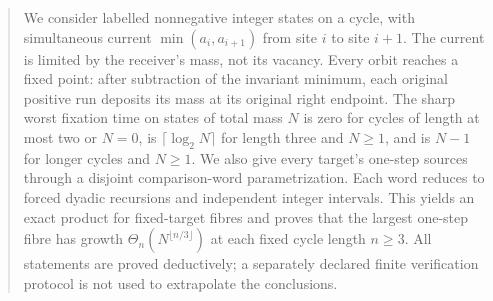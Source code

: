 \begin{abstract}
We consider labelled nonnegative integer states on a cycle, with simultaneous
current $\min(a_i,a_{i+1})$ from site $i$ to site $i+1$. The current is
limited by the receiver's mass, not its vacancy. Every orbit reaches a
fixed point: after subtraction of the invariant minimum, each original
positive run deposits its mass at its original right endpoint. The sharp
worst fixation time on states of total mass $N$ is zero for cycles of
length at most two or $N=0$, is $\lceil\log_2N\rceil$ for length three and
$N\ge1$, and is $N-1$ for longer cycles and $N\ge1$. We also give every
target's one-step sources through a disjoint comparison-word
parametrization. Each word reduces to forced dyadic recursions and
independent integer intervals. This yields an exact product for fixed-target
fibres and proves that the largest one-step fibre has growth
$\Theta_n(N^{\lfloor n/3\rfloor})$ at each fixed cycle length $n\ge3$.
All statements are proved deductively; a separately declared finite
verification protocol is not used to extrapolate the conclusions.
\end{abstract}

